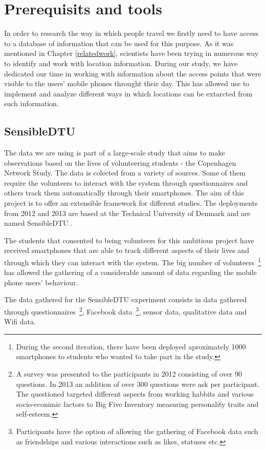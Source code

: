 \chapter{Prerequisits and tools}
In order to research the way in which people travel we firstly need to have
access to a database of information that can be used for this purpose. As it was
mentioned in Chapter \ref{relatedwork}, scientists have been trying in numerous
way to identify and work with location information. During our study, we have
dedicated our time in working with information about the access points that were
visible to the users' mobile phones throught their day. This has allowed use to
implement and analyze different ways in which locations can be extarcted from
such information.

\section{SensibleDTU}
The data we are using is part of a large-scale study that aims to make
observations based on the lives of volunteering students - the Copenhagen
Network Study. The data is colected from a variety of sources. Some of them
require the volunteers to interact with the system through questionnaires and
others track them automatically through their smartphones. The aim of this
project is to offer an extensible framework for different studies. The
deployments from 2012 and 2013 are based at the Technical University of Denmark
and are named SensibleDTU \cite{Stopczynski14m}.

The students that consented to being volunteers for this ambitious project have
received smartphones that are able to track different aspects of their lives and
through which they can interact with the system. The big number of
volunteers~\footnote{During the second iteration, there have been deployed
aproximately 1000 smartphones to students who wanted to take part in the study.}
has allowed the gathering of a considerable amount of data regarding the mobile
phone users' behaviour.

The data gathered for the SensibleDTU experiment consists in data gathered
through questionnaires~\footnote{A survey was presented to the participants in
2012 consisting of over 90 questions. In 2013 an addition of over 300 questions
were ask per participant. The questioned targeted different aspects from working
habbits and various socio-econimic factors to Big Five Inventory measuring
personality traits \cite{John99} and self-esteem.}, Facebook
data~\footnote{Participants have the option of allowing the gathering of
Facebook data such as friendships and various interactions such as likes,
statuses etc.}, sensor data, qualitative data and Wifi data.

